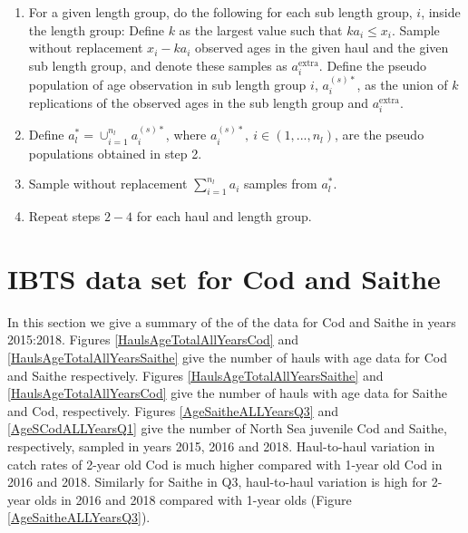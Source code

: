 \documentclass[a4paper 12pt]{article}
\numberwithin{equation}{section}
\begin{document}
\begin{enumerate}
\item For a given length group, do the following for each sub length group, $i$, inside the length group: Define $k$ as the largest value such that $ka_{i} \leq x_{i}$. Sample without replacement $x_{i} - k a_{i}$ observed ages in the given haul and the given sub length group, and denote these samples as $a^{\mathrm{extra}}_{i}$. Define the pseudo population of age observation in sub length group $i$, $a^{(s)*}_{i}$, as the union of $k$ replications of the observed ages in the sub length group and $a^{\mathrm{extra}}_{i}$.

\item Define $a^{*}_{l} = \cup_{i = 1}^{n_{l}} a^{(s)*}_{i} $, where $a^{(s)*}_{i}, \ i \in \left(1,...,n_{l} \right)$, are the pseudo populations obtained in step 2.

\item Sample without replacement $\sum_{i = 1}^{n_{l}} a_{i}$ samples from $a^{*}_{l} $.

\item Repeat steps $2-4$ for each haul and length group.
\end{enumerate}

\clearpage
\section{\large IBTS data set for Cod and Saithe}
\label{secAp:data}

In this section we give a summary of the of the data for Cod and Saithe in years 2015:2018. Figures \ref{HaulsAgeTotalAllYearsCod} and \ref{HaulsAgeTotalAllYearsSaithe} give the number of hauls with age data for Cod and Saithe respectively. Figures \ref{HaulsAgeTotalAllYearsSaithe} and \ref{HaulsAgeTotalAllYearsCod} give the number of hauls with age data for Saithe and Cod, respectively. Figures \ref{AgeSaitheALLYearsQ3} and  \ref{AgeSCodALLYearsQ1}  give the  number of North Sea juvenile Cod and Saithe, respectively, sampled in years 2015, 2016 and 2018. Haul-to-haul variation in catch rates of 2-year old Cod is much higher compared with 1-year old Cod in 2016 and 2018. Similarly for Saithe in Q3, haul-to-haul variation is high for 2-year olds in 2016 and 2018 compared with 1-year olds (Figure \ref{AgeSaitheALLYearsQ3}).
\end{document}
